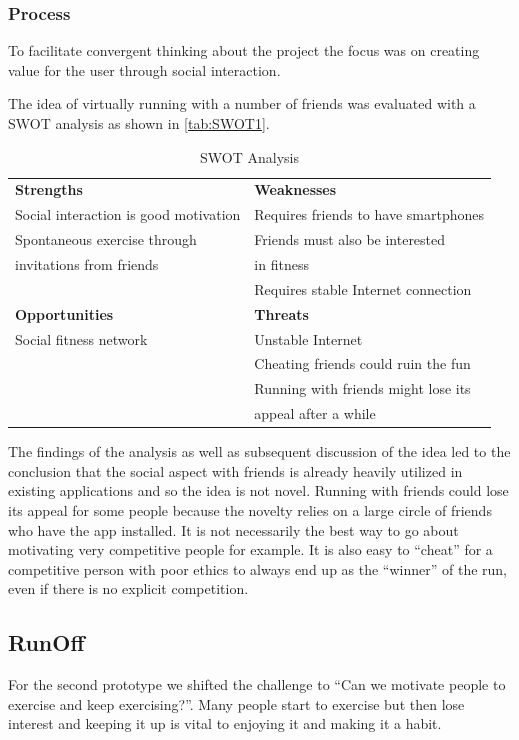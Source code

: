 \subsubsection{Process}
To facilitate convergent thinking about the project the focus was on creating value for the user through social interaction. 

The idea of virtually running with a number of friends was evaluated with a \ac{SWOT} analysis as shown in \autoref{tab:SWOT1}.

\begin{table}[!ht]
	\begin{tabular}{| l | l |}
		\hline
		\textbf{Strengths} & \textbf{Weaknesses} \\ 
		Social interaction is good motivation & Requires friends to have smartphones \\
		Spontaneous exercise through & Friends must also be interested \\
		invitations from friends &  in fitness \\
		& Requires stable Internet connection \\ \hline
		\textbf{Opportunities} & \textbf{Threats} \\ 
		Social fitness network & Unstable Internet \\
		& Cheating friends could ruin the fun \\
		& Running with friends might lose its \\
		& appeal after a while \\
		\hline
	\end{tabular}
	\caption{SWOT Analysis}
	\label{tab:SWOT1}
\end{table}

The findings of the analysis as well as subsequent discussion of the idea led to the conclusion that the social aspect with friends is already heavily utilized in existing applications and so the idea is not novel. Running with friends could lose its appeal for some people because the novelty relies on a large circle of friends who have the app installed. It is not necessarily the best way to go about motivating very competitive people for example. It is also easy to ``cheat'' for a competitive person with poor ethics to always end up as the ``winner'' of the run, even if there is no explicit competition.

\subsection{RunOff}
For the second prototype we shifted the challenge to ``Can we motivate people to exercise and keep exercising?''. Many people start to exercise but then lose interest and keeping it up is vital to enjoying it and making it a habit. 

